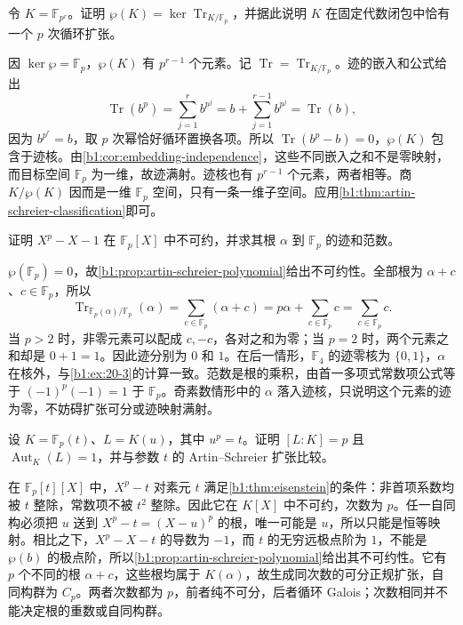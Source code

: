 \begin{exercise}\label{b1:ex:20-13}
	令 \(K=\mathbb F_{p^r}\)。证明 \(\wp(K)=\ker\operatorname{Tr}_{K/\mathbb F_p}\)，并据此说明 \(K\) 在固定代数闭包中恰有一个 \(p\) 次循环扩张。
\end{exercise}
\begin{solution}
	因 \(\ker\wp=\mathbb F_p\)，\(\wp(K)\) 有 \(p^{r-1}\) 个元素。记 \(\operatorname{Tr}=\operatorname{Tr}_{K/\mathbb F_p}\)。迹的嵌入和公式给出
	\[
		\operatorname{Tr}(b^p) =\sum_{j=1}^{r}b^{p^j} =b+\sum_{j=1}^{r-1}b^{p^j} =\operatorname{Tr}(b),
	\]
	因为 \(b^{p^r}=b\)，取 \(p\) 次幂恰好循环置换各项。所以 \(\operatorname{Tr}(b^p-b)=0\)，\(\wp(K)\) 包含于迹核。由\cref{b1:cor:embedding-independence}，这些不同嵌入之和不是零映射，而目标空间 \(\mathbb F_p\) 为一维，故迹满射。迹核也有 \(p^{r-1}\) 个元素，两者相等。商 \(K/\wp(K)\) 因而是一维 \(\mathbb F_p\) 空间，只有一条一维子空间。应用\cref{b1:thm:artin-schreier-classification}即可。
\end{solution}

\begin{exercise}\label{b1:ex:20-14}
	证明 \(X^p-X-1\) 在 \(\mathbb F_p[X]\) 中不可约，并求其根 \(\alpha\) 到 \(\mathbb F_p\) 的迹和范数。
\end{exercise}
\begin{solution}
	\(\wp(\mathbb F_p)=0\)，故\cref{b1:prop:artin-schreier-polynomial}给出不可约性。全部根为 \(\alpha+c\)、\(c\in\mathbb F_p\)，所以
	\[
		\operatorname{Tr}_{\mathbb F_p(\alpha)/\mathbb F_p}(\alpha) =\sum_{c\in\mathbb F_p}(\alpha+c) =p\alpha+\sum_{c\in\mathbb F_p}c =\sum_{c\in\mathbb F_p}c.
	\]
	当 \(p>2\) 时，非零元素可以配成 \(c,-c\)，各对之和为零；当 \(p=2\) 时，两个元素之和却是 \(0+1=1\)。因此迹分别为 \(0\) 和 \(1\)。在后一情形，\(\mathbb F_4\) 的迹零核为 \(\{0,1\}\)，\(\alpha\) 在核外，与\cref{b1:ex:20-3}的计算一致。范数是根的乘积，由首一多项式常数项公式等于 \((-1)^p(-1)=1\) 于 \(\mathbb F_p\)。奇素数情形中的 \(\alpha\) 落入迹核，只说明这个元素的迹为零，不妨碍扩张可分或迹映射满射。
\end{solution}

\begin{exercise}\label{b1:ex:20-15}
	设 \(K=\mathbb F_p(t)\)、\(L=K(u)\)，其中 \(u^p=t\)。证明 \([L:K]=p\) 且 \(\operatorname{Aut}_K(L)=1\)，并与参数 \(t\) 的 Artin--Schreier 扩张比较。
\end{exercise}
\begin{solution}
	在 \(\mathbb F_p[t][X]\) 中，\(X^p-t\) 对素元 \(t\) 满足\cref{b1:thm:eisenstein}的条件：非首项系数均被 \(t\) 整除，常数项不被 \(t^2\) 整除。因此它在 \(K[X]\) 中不可约，次数为 \(p\)。任一自同构必须把 \(u\) 送到 \(X^p-t=(X-u)^p\) 的根，唯一可能是 \(u\)，所以只能是恒等映射。相比之下，\(X^p-X-t\) 的导数为 \(-1\)，而 \(t\) 的无穷远极点阶为 \(1\)，不能是 \(\wp(b)\) 的极点阶，所以\cref{b1:prop:artin-schreier-polynomial}给出其不可约性。它有 \(p\) 个不同的根 \(\alpha+c\)，这些根均属于 \(K(\alpha)\)，故生成同次数的可分正规扩张，自同构群为 \(C_p\)。两者次数都为 \(p\)，前者纯不可分，后者循环 Galois；次数相同并不能决定根的重数或自同构群。
\end{solution}
